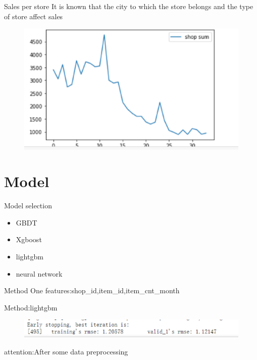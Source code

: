 \documentclass[
 size=14pt,
 paper=smartboard,  %
 mode=present, 		%
 display=slides, 	%
 style=tuliplab,  	%
 pauseslide,
 fleqn,leqno]{powerdot}
\begin{document}
\begin{slide}[toc=,bm=]{Sales per store}
  It is known that the city to which the store belongs and the type of store affect sales
  \begin{figure}
    \includegraphics[scale=0.5]{picture/data_19.eps}
  \end{figure}
\end{slide}


\section{Model}


\begin{slide}[toc=,bm=]{Model selection}
  \begin{itemize}
    \item GBDT
    \item Xgboost
    \item lightgbm
    \item neural network
  \end{itemize}
\end{slide}

\begin{slide}[toc=,bm=]{Method One}
  features:shop_id,item_id,item_cnt_month\par
  Method:lightgbm
  \begin{figure}
    \includegraphics[scale=0.5]{picture/data_14.eps}
  \end{figure}
  attention:After some data preprocessing
\end{slide}
\end{document}

